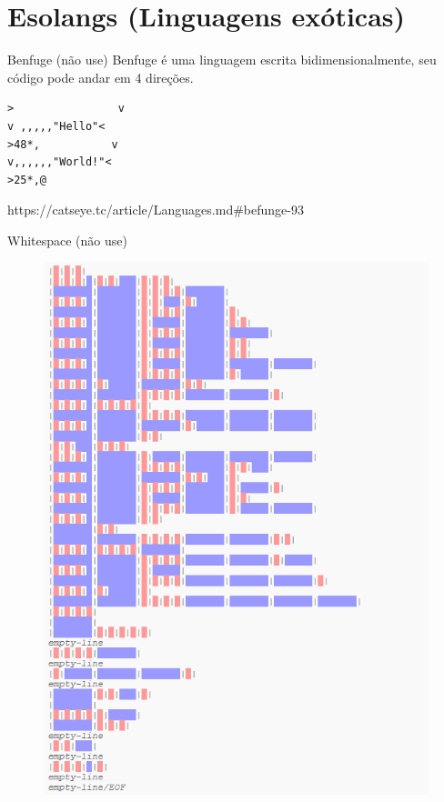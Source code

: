 \section{Esolangs (Linguagens exóticas)}

\begin{frame}[fragile]{Benfuge (não use)}
\small{Benfuge é uma linguagem escrita bidimensionalmente, seu código pode andar em 4 direções.}
\lstset{language=Rust, style=boxed}
\begin{lstlisting}
>                v
v ,,,,,"Hello"<
>48*,           v
v,,,,,,"World!"<
>25*,@
\end{lstlisting}
\small{https://catseye.tc/article/Languages.md\#befunge-93}
\end{frame}

\begin{frame}[fragile]{Whitespace (não use)}
\begin{figure}[ht!]
  \centering
  \includegraphics[scale=0.4]{images/whitespace.png}
\end{figure}
\end{frame}

